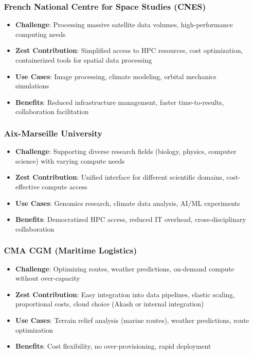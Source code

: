 \documentclass[11pt,a4paper]{article}
\begin{document}
	\subsubsection{French National Centre for Space Studies (CNES)}
	
	\begin{itemize}
		\item \textbf{Challenge}: Processing massive satellite data volumes, high-performance computing needs
		\item \textbf{Zest Contribution}: Simplified access to HPC resources, cost optimization, containerized tools for spatial data processing
		\item \textbf{Use Cases}: Image processing, climate modeling, orbital mechanics simulations
		\item \textbf{Benefits}: Reduced infrastructure management, faster time-to-results, collaboration facilitation
	\end{itemize}
	
	\subsubsection{Aix-Marseille University}
	
	\begin{itemize}
		\item \textbf{Challenge}: Supporting diverse research fields (biology, physics, computer science) with varying compute needs
		\item \textbf{Zest Contribution}: Unified interface for different scientific domains, cost-effective compute access
		\item \textbf{Use Cases}: Genomics research, climate data analysis, AI/ML experiments
		\item \textbf{Benefits}: Democratized HPC access, reduced IT overhead, cross-disciplinary collaboration
	\end{itemize}
	
	\subsubsection{CMA CGM (Maritime Logistics)}
	
	\begin{itemize}
		\item \textbf{Challenge}: Optimizing routes, weather predictions, on-demand compute without over-capacity
		\item \textbf{Zest Contribution}: Easy integration into data pipelines, elastic scaling, proportional costs, cloud choice (Akash or internal integration)
		\item \textbf{Use Cases}: Terrain relief analysis (marine routes), weather predictions, route optimization
		\item \textbf{Benefits}: Cost flexibility, no over-provisioning, rapid deployment
	\end{itemize}
	
\end{document}
